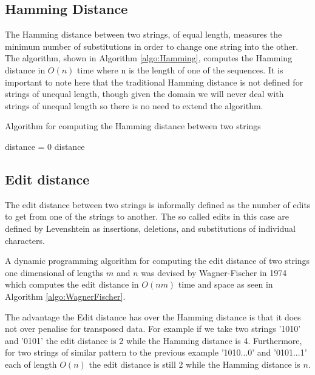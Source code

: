 \documentclass[12pt,twoside,notitlepage]{report}
\begin{document}
	\subsection{Hamming Distance}
		The Hamming distance\cite{Hamming1950} between two strings, of equal length, measures the minimum number of substitutions in order to change one string into the other. The algorithm, shown in Algorithm \ref{algo:Hamming}, computes the Hamming distance in $O(n)$ time where n is the length of one of the sequences. It is important to note here that the traditional Hamming distance is not defined for strings of unequal length, though given the domain we will never deal with strings of unequal length so there is no need to extend the algorithm.
		\begin{algorithm}
			\caption{Algorithm for computing the Hamming distance between two strings}
			\label{algo:Hamming}
			\begin{algorithmic}[1]
				\State distance = 0
					\EndIf
				\EndFor
				\State \Return distance
			\EndProcedure
			\end{algorithmic}
		\end{algorithm}
		
		
 		\subsection{Edit distance}
		The edit distance between two strings is informally defined as the number of edits to get from one of the strings to another. The so called edits in this case are defined by Levenshtein\cite{Levenshtein1966} as insertions, deletions, and substitutions of individual characters. 
		
		A dynamic programming algorithm for computing the edit distance of two strings one dimensional of lengths $m$ and $n$ was devised by Wagner-Fischer in 1974\cite{WagnerFischer1974} which computes the edit distance in $O(nm)$ time and space as seen in Algorithm \ref{algo:WagnerFischer}. 
		
		The advantage the Edit distance has over the Hamming distance is that it does not over penalise for transposed data. For example if we take two strings '1010' and '0101' the edit distance is 2 while the Hamming distance is 4. Furthermore, for two strings of similar pattern to the previous example '1010...0' and '0101...1' each of length $O(n)$ the edit distance is still 2 while the Hamming distance is $n$.
		
\end{document}
